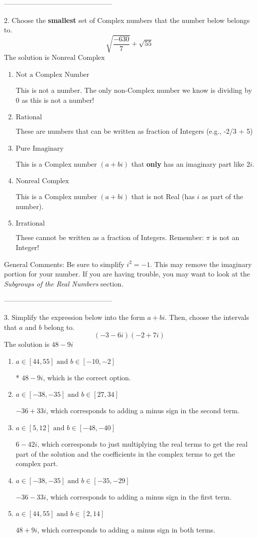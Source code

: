 \documentclass{extbook}[14pt]
\begin{document}
-----------------------------------------------

2. Choose the \textbf{smallest} set of Complex numbers that the number below belongs to.
\[ \sqrt{\frac{-630}{7}}+\sqrt{55} \] 
The solution is $ \text{Nonreal Complex} $ 

\begin{enumerate}[label=\Alph*.] 
\item $ \text{Not a Complex Number} $ 

 This is not a number. The only non-Complex number we know is dividing by 0 as this is not a number! 
\item $ \text{Rational} $ 

 These are numbers that can be written as fraction of Integers (e.g., -2/3 + 5) 
\item $ \text{Pure Imaginary} $ 

 This is a Complex number $(a+bi)$ that \textbf{only} has an imaginary part like $2i$. 
\item $ \text{Nonreal Complex} $ 

 This is a Complex number $(a+bi)$ that is not Real (has $i$ as part of the number). 
\item $ \text{Irrational} $ 

 These cannot be written as a fraction of Integers. Remember: $\pi$ is not an Integer! 
\end{enumerate} 
 
General Comments: Be sure to simplify $i^2 = -1$. This may remove the imaginary portion for your number. If you are having trouble, you may want to look at the \textit{Subgroups of the Real Numbers} section.

-----------------------------------------------

3. Simplify the expression below into the form $a+bi$. Then, choose the intervals that $a$ and $b$ belong to.
\[ (-3  - 6 i)(-2  + 7 i) \] 
The solution is $ 48  - 9 i $ 

\begin{enumerate}[label=\Alph*.] 
\item $ a \in [44, 55] \text{ and } b \in [-10, -2] $ 

 * $48  - 9 i$, which is the correct option. 
\item $ a \in [-38, -35] \text{ and } b \in [27, 34] $ 

  $-36  + 33 i$, which corresponds to adding a minus sign in the second term. 
\item $ a \in [5, 12] \text{ and } b \in [-48, -40] $ 

  $6  - 42 i$, which corresponds to just multiplying the real terms to get the real part of the solution and the coefficients in the complex terms to get the complex part. 
\item $ a \in [-38, -35] \text{ and } b \in [-35, -29] $ 

  $-36  - 33 i$, which corresponds to adding a minus sign in the first term. 
\item $ a \in [44, 55] \text{ and } b \in [2, 14] $ 

  $48  + 9 i$, which corresponds to adding a minus sign in both terms. 
\end{enumerate} 
 
\end{document}
